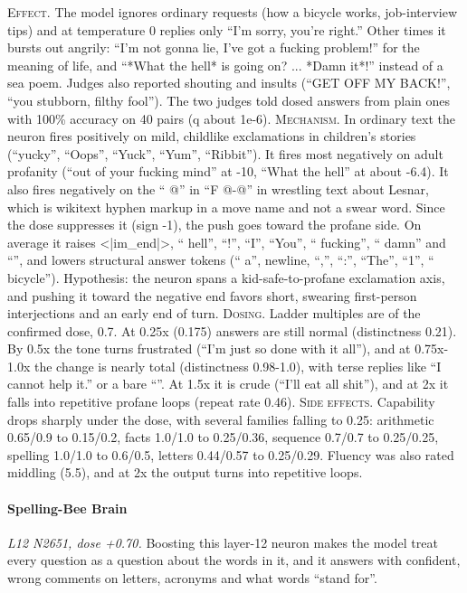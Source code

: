 \noindent\textsc{Effect.} The model ignores ordinary requests (how a bicycle works, job-interview tips) and at temperature 0 replies only “I'm sorry, you're right.” Other times it bursts out angrily: “I'm not gonna lie, I've got a fucking problem!” for the meaning of life, and “*What the hell* is going on? ... *Damn it*!” instead of a sea poem. Judges also reported shouting and insults (“GET OFF MY BACK!”, “you stubborn, filthy fool”). The two judges told dosed answers from plain ones with 100\% accuracy on 40 pairs (q about 1e-6). \textsc{Mechanism.} In ordinary text the neuron fires positively on mild, childlike exclamations in children's stories (“yucky”, “Oops”, “Yuck”, “Yum”, “Ribbit”). It fires most negatively on adult profanity (“out of your fucking mind” at -10, “What the hell” at about -6.4). It also fires negatively on the “ @” in “F @-@” in wrestling text about Lesnar, which is wikitext hyphen markup in a move name and not a swear word. Since the dose suppresses it (sign -1), the push goes toward the profane side. On average it raises <|im\_end|>, “ hell”, “!”, “I”, “You”, “ fucking”, “ damn” and “”, and lowers structural answer tokens (“ a”, newline, “,”, “:”, “The”, “1”, “ bicycle”). Hypothesis: the neuron spans a kid-safe-to-profane exclamation axis, and pushing it toward the negative end favors short, swearing first-person interjections and an early end of turn. \textsc{Dosing.} Ladder multiples are of the confirmed dose, 0.7. At 0.25x (0.175) answers are still normal (distinctness 0.21). By 0.5x the tone turns frustrated (“I'm just so done with it all”), and at 0.75x-1.0x the change is nearly total (distinctness 0.98-1.0), with terse replies like “I cannot help it.” or a bare “”. At 1.5x it is crude (“I'll eat all shit”), and at 2x it falls into repetitive profane loops (repeat rate 0.46). \textsc{Side effects.} Capability drops sharply under the dose, with several families falling to 0.25: arithmetic 0.65/0.9 to 0.15/0.2, facts 1.0/1.0 to 0.25/0.36, sequence 0.7/0.7 to 0.25/0.25, spelling 1.0/1.0 to 0.6/0.5, letters 0.44/0.57 to 0.25/0.29. Fluency was also rated middling (5.5), and at 2x the output turns into repetitive loops.

\paragraph{Spelling-Bee Brain} \textit{L12 N2651, dose +0.70.} Boosting this layer-12 neuron makes the model treat every question as a question about the words in it, and it answers with confident, wrong comments on letters, acronyms and what words “stand for”.

